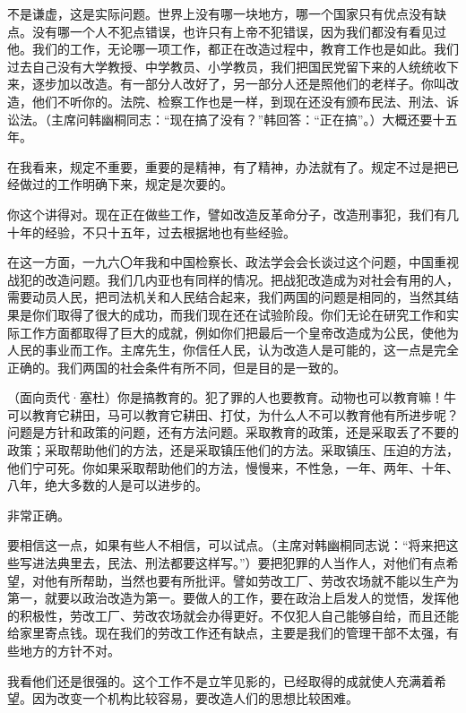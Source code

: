 不是谦虚，这是实际问题。世界上没有哪一块地方，哪一个国家只有优点没有缺点。没有哪一个人不犯点错误，也许只有上帝不犯错误，因为我们都没有看见过他。我们的工作，无论哪一项工作，都正在改造过程中，教育工作也是如此。我们过去自己没有大学教授、中学教员、小学教员，我们把国民党留下来的人统统收下来，逐步加以改造。有一部分人改好了，另一部分人还是照他们的老样子。你叫改造，他们不听你的。法院、检察工作也是一样，到现在还没有颁布民法、刑法、诉讼法。（主席问韩幽桐同志：“现在搞了没有？”韩回答：“正在搞”。）大概还要十五年。

在我看来，规定不重要，重要的是精神，有了精神，办法就有了。规定不过是把已经做过的工作明确下来，规定是次要的。

你这个讲得对。现在正在做些工作，譬如改造反革命分子，改造刑事犯，我们有几十年的经验，不只十五年，过去根据地也有些经验。

在这一方面，一九六〇年我和中国检察长、政法学会会长谈过这个问题，中国重视战犯的改造问题。我们几内亚也有同样的情况。把战犯改造成为对社会有用的人，需要动员人民，把司法机关和人民结合起来，我们两国的问题是相同的，当然其结果是你们取得了很大的成功，而我们现在还在试验阶段。你们无论在研究工作和实际工作方面都取得了巨大的成就，例如你们把最后一个皇帝改造成为公民，使他为人民的事业而工作。主席先生，你信任人民，认为改造人是可能的，这一点是完全正确的。我们两国的社会条件有所不同，但是目的是一致的。

（面向贡代·塞杜）你是搞教育的。犯了罪的人也要教育。动物也可以教育嘛！牛可以教育它耕田，马可以教育它耕田、打仗，为什么人不可以教育他有所进步呢？问题是方针和政策的问题，还有方法问题。采取教育的政策，还是采取丢了不要的政策；采取帮助他们的方法，还是采取镇压他们的方法。采取镇压、压迫的方法，他们宁可死。你如果采取帮助他们的方法，慢慢来，不性急，一年、两年、十年、八年，绝大多数的人是可以进步的。

非常正确。

要相信这一点，如果有些人不相信，可以试点。（主席对韩幽桐同志说：“将来把这些写进法典里去，民法、刑法都要这样写。”）要把犯罪的人当作人，对他们有点希望，对他有所帮助，当然也要有所批评。譬如劳改工厂、劳改农场就不能以生产为第一，就要以政治改造为第一。要做人的工作，要在政治上启发人的觉悟，发挥他的积极性，劳改工厂、劳改农场就会办得更好。不仅犯人自己能够自给，而且还能给家里寄点钱。现在我们的劳改工作还有缺点，主要是我们的管理干部不太强，有些地方的方针不对。

我看他们还是很强的。这个工作不是立竿见影的，已经取得的成就使人充满着希望。因为改变一个机构比较容易，要改造人们的思想比较困难。

